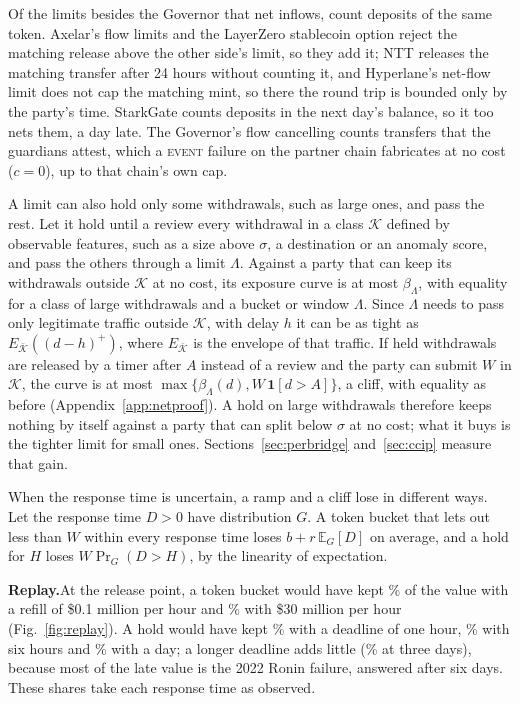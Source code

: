 \documentclass[conference,compsoc]{IEEEtran}
\numberwithin{equation}{section}
\theoremstyle{plain}
\theoremstyle{definition}
\theoremstyle{remark}
\newcommand{\runin}[1]{\par\smallskip\noindent\textbf{#1.}\enspace}
\newcommand{\cev}{\textsc{event}}
\begin{document}
Of the \nRulesNetWords{} limits besides the Governor that net inflows, \nRulesNetSameTokenWords{} count deposits of the same token. Axelar's flow limits and the LayerZero stablecoin option reject the matching release above the other side's limit, so they add it; NTT releases the matching transfer after 24 hours without counting it, and Hyperlane's net-flow limit does not cap the matching mint, so there the round trip is bounded only by the party's time. StarkGate counts deposits in the next day's balance, so it too nets them, a day late. The Governor's flow cancelling counts transfers that the guardians attest, which a \cev{} failure on the partner chain fabricates at no cost ($c = 0$), up to that chain's own cap.

A limit can also hold only some withdrawals, such as large ones, and pass the rest. Let it hold until a review every withdrawal in a class $\mathcal{K}$ defined by observable features, such as a size above $\sigma$, a destination or an anomaly score, and pass the others through a limit $\Lambda$. Against a party that can keep its withdrawals outside $\mathcal{K}$ at no cost, its exposure curve is at most $\beta_\Lambda$, with equality for a class of large withdrawals and a bucket or window $\Lambda$. Since $\Lambda$ needs to pass only legitimate traffic outside $\mathcal{K}$, with delay $h$ it can be as tight as $E_{\bar{\mathcal{K}}}((d-h)^+)$, where $E_{\bar{\mathcal{K}}}$ is the envelope of that traffic. If held withdrawals are released by a timer after $A$ instead of a review and the party can submit $W$ in $\mathcal{K}$, the curve is at most $\max\{\beta_\Lambda(d), W\,\mathbf{1}[d > A]\}$, a cliff, with equality as before (Appendix~\ref{app:netproof}). A hold on large withdrawals therefore keeps nothing by itself against a party that can split below $\sigma$ at no cost; what it buys is the tighter limit for small ones. Sections~\ref{sec:perbridge} and~\ref{sec:ccip} measure that gain.

When the response time is uncertain, a ramp and a cliff lose in different ways. Let the response time $D > 0$ have distribution $G$. A token bucket that lets out less than $W$ within every response time loses $b + r\,\mathbb{E}_G[D]$ on average, and a hold for $H$ loses $W \Pr_G(D > H)$, by the linearity of expectation.

\runin{Replay}At the release point, a token bucket would have kept \rampPointOneMPct\% of the value with a refill of \$0.1 million per hour and \rampThirtyMPct\% with \$30 million per hour (Fig.~\ref{fig:replay}). A hold would have kept \cliffOneHPct\% with a deadline of one hour, \cliffSixHPct\% with six hours and \cliffDayPct\% with a day; a longer deadline adds little (\cliffThreeDPct\% at three days), because most of the late value is the 2022 Ronin failure, answered after six days. These shares take each response time as observed.
\end{document}
